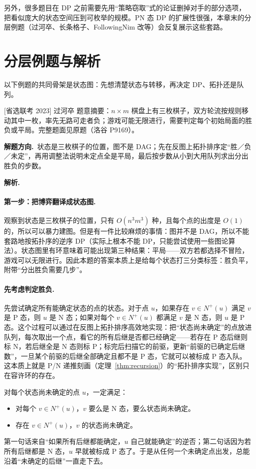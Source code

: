 \documentclass[UTF8,a4paper,11pt,oneside,openany,fontset=fandol]{ctexbook}
\theoremstyle{definition}
\newcommand{\Np}{N^+}
\newcommand{\sol}{\par\noindent\textbf{解析.}\ }
\newcommand{\hint}{\par\noindent\textbf{解题方向.}\ }
\begin{document}
另外，很多题目在 DP 之前需要先用“策略窃取”式的论证删掉对手的部分选项，把看似庞大的状态空间压到可枚举的规模。PN 态 DP 的扩展性很强，本章末的分层例题（过河卒、长条格子、FollowingNim 改等）会反复展示这些套路。

\section{分层例题与解析}

以下例题的共同骨架是状态图：先想清楚状态与转移，再决定 DP、拓扑还是队列。

\begin{problem}{[省选联考 2023] 过河卒}
题意摘要：$n\times m$ 棋盘上有三枚棋子，双方轮流按规则移动其中一枚，率先无路可走者负；游戏可能无限进行，需要判定每个初始局面的胜负或平局。完整题面见原题（洛谷 P9169）。
\end{problem}

\hint 状态是三枚棋子的位置，图不是 DAG；先在反图上拓扑排序定“胜／负／未定”，再用调整法说明未定点全是平局，最后按步数从小到大用队列求出分出胜负的步数。

\sol \paragraph{第一步：把博弈翻译成状态图.} 观察到状态是三枚棋子的位置，只有 $O(n^3m^3)$ 种，且每个点的出度是 $O(1)$ 的，所以可以暴力建图。但是有一件比较麻烦的事情：图并不是 DAG，所以不能套路地按拓扑序的逆序 DP（实际上根本不能 DP，只能尝试使用一些图论算法）。状态图里有环意味着可能出现第三种结果：平局——双方若都选择不冒险，游戏可以无限进行。因此本题的答案本质上是给每个状态打三分类标签：胜负平，附带“分出胜负需要几步”。

\paragraph{先考虑判定胜负.} 先尝试确定所有能确定状态的点的状态。对于点 $u$，如果存在 $v\in\Np(u)$ 满足 $v$ 是 P 态，则 $u$ 是 N 态；如果对每个 $v\in\Np(u)$ 都满足 $v$ 是 N 态，则 $u$ 是 P 态。这个过程可以通过在反图上拓扑排序高效地实现：把“状态尚未确定”的点放进队列，每次取出一个点，看它的所有后继是否都已经确定——若存在 P 态后继则标 N，若后继全是 N 态则标 P；标完后扫描它的前驱，更新“前驱的已确定后继数”，一旦某个前驱的后继全部确定且都不是 P 态，它就可以被标成 P 态入队。这本质上就是 P/N 递推刻画（定理~\ref{thm:recursion}）的“拓扑排序实现”，区别只在容许环的存在。

对每个状态尚未确定的点 $u$，一定满足：
\begin{itemize}
\item 对每个 $v\in\Np(u)$，$v$ 要么是 N 态，要么状态尚未确定。
\item 存在 $v\in\Np(u)$，$v$ 的状态尚未确定。
\end{itemize}
第一句话来自“如果所有后继都能确定，$u$ 自己就能确定”的逆否；第二句话因为若所有后继都是 N 态，$u$ 早就被标成 P 态了。于是从任何一个未确定点出发，总能沿着“未确定的后继”一直走下去。
\end{document}
